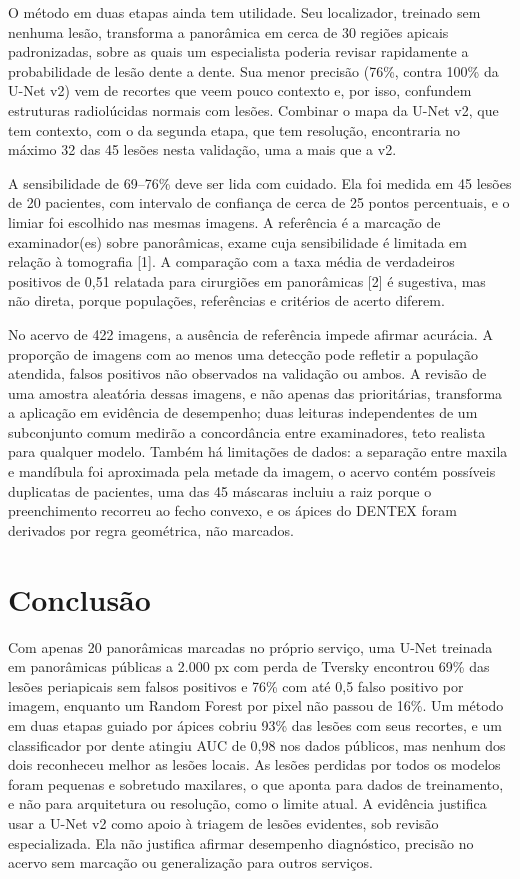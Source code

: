 \documentclass[twocolumn]{article}
\begin{document}
O método em duas etapas ainda tem utilidade. Seu localizador, treinado sem nenhuma lesão, transforma a panorâmica em cerca de 30 regiões apicais padronizadas, sobre as quais um especialista poderia revisar rapidamente a probabilidade de lesão dente a dente. Sua menor precisão (76\%, contra 100\% da U-Net v2) vem de recortes que veem pouco contexto e, por isso, confundem estruturas radiolúcidas normais com lesões. Combinar o mapa da U-Net v2, que tem contexto, com o da segunda etapa, que tem resolução, encontraria no máximo 32 das 45 lesões nesta validação, uma a mais que a v2.

A sensibilidade de 69--76\% deve ser lida com cuidado. Ela foi medida em 45 lesões de 20 pacientes, com intervalo de confiança de cerca de 25 pontos percentuais, e o limiar foi escolhido nas mesmas imagens. A referência é a marcação de examinador(es) sobre panorâmicas, exame cuja sensibilidade é limitada em relação à tomografia [1]. A comparação com a taxa média de verdadeiros positivos de 0,51 relatada para cirurgiões em panorâmicas [2] é sugestiva, mas não direta, porque populações, referências e critérios de acerto diferem.

No acervo de 422 imagens, a ausência de referência impede afirmar acurácia. A proporção de imagens com ao menos uma detecção pode refletir a população atendida, falsos positivos não observados na validação ou ambos. A revisão de uma amostra aleatória dessas imagens, e não apenas das prioritárias, transforma a aplicação em evidência de desempenho; duas leituras independentes de um subconjunto comum medirão a concordância entre examinadores, teto realista para qualquer modelo. Também há limitações de dados: a separação entre maxila e mandíbula foi aproximada pela metade da imagem, o acervo contém possíveis duplicatas de pacientes, uma das 45 máscaras incluiu a raiz porque o preenchimento recorreu ao fecho convexo, e os ápices do DENTEX foram derivados por regra geométrica, não marcados.

\section{Conclusão}

Com apenas 20 panorâmicas marcadas no próprio serviço, uma U-Net treinada em panorâmicas públicas a 2.000 px com perda de Tversky encontrou 69\% das lesões periapicais sem falsos positivos e 76\% com até 0,5 falso positivo por imagem, enquanto um Random Forest por pixel não passou de 16\%. Um método em duas etapas guiado por ápices cobriu 93\% das lesões com seus recortes, e um classificador por dente atingiu AUC de 0,98 nos dados públicos, mas nenhum dos dois reconheceu melhor as lesões locais. As lesões perdidas por todos os modelos foram pequenas e sobretudo maxilares, o que aponta para dados de treinamento, e não para arquitetura ou resolução, como o limite atual. A evidência justifica usar a U-Net v2 como apoio à triagem de lesões evidentes, sob revisão especializada. Ela não justifica afirmar desempenho diagnóstico, precisão no acervo sem marcação ou generalização para outros serviços.
\end{document}
